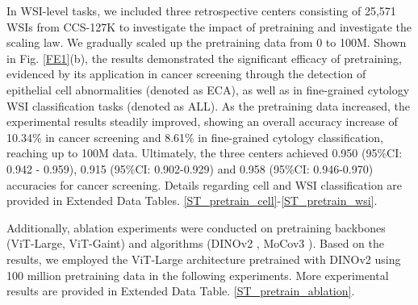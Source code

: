 In WSI-level tasks, we included three retrospective centers consisting of 25,571 WSIs from CCS-127K to investigate the impact of pretraining and investigate the scaling law. We gradually scaled up the pretraining data from 0 to 100M. Shown in Fig. \ref{FE1}(b), the results demonstrated the significant efficacy of pretraining, evidenced by its application in cancer screening through the detection of epithelial cell abnormalities (denoted as ECA), as well as in fine-grained cytology WSI classification tasks (denoted as ALL). As the pretraining data increased, the experimental results steadily improved, showing an overall accuracy increase of 10.34\% in cancer screening and 8.61\% in fine-grained cytology classification, reaching up to 100M data. Ultimately, the three centers achieved 0.950 (95\%CI: 0.942 - 0.959), 0.915 (95\%CI: 0.902-0.929) and 0.958 (95\%CI: 0.946-0.970) accuracies for cancer screening. Details regarding cell and WSI classification are provided in Extended Data Tables. \ref{ST_pretrain_cell}-\ref{ST_pretrain_wsi}.

 Additionally, ablation experiments were conducted on pretraining backbones (ViT-Large, ViT-Gaint) and algorithms (DINOv2 \cite{oquabdinov2}, MoCov3 \cite{chen2021empirical}). Based on the results, we employed the ViT-Large architecture pretrained with DINOv2 using 100 million pretraining data in the following experiments. More experimental results are provided in Extended Data Table. \ref{ST_pretrain_ablation}. 

